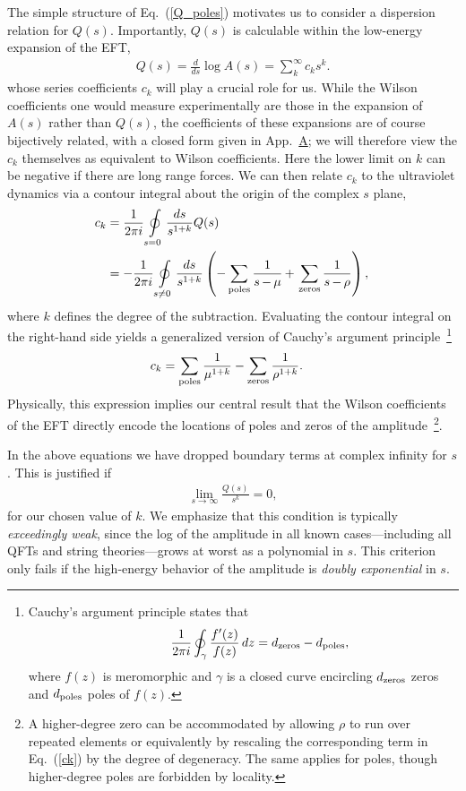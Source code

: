 \documentclass[twocolumn,english,aps,prd,reprint,floatfix,notitlepage,footinbib,preprintnumbers,superscriptaddress,longbibliography]{revtex4-1}
\newcommand{\be}{\begin{equation}}
\newcommand{\ee}{\end{equation}}
\newcommand{\Eq}[1]{Eq.~(\ref{#1})}
\newcommand{\eq}[2]{\be\begin{aligned}#1 \label{#2}\end{aligned}\ee}
\begin{document}
The simple structure of \Eq{Q_poles} motivates us to consider a dispersion relation for $Q(s)$.  Importantly, $Q(s)$ is calculable within the low-energy expansion of the EFT,
\eq{
Q(s) = \frac{d}{ds} \log A(s) = \sum_{k}^\infty c_k s^k.
}{Q_def}
whose series coefficients $c_k$ will play a crucial role for us.
While the Wilson coefficients one would measure experimentally are those in the expansion of $A(s)$ rather than $Q(s)$, the coefficients of these expansions are of course bijectively related, with a closed form given in App.~\hyperref[app:AQ]{A}; we will therefore view the $c_k$ themselves as equivalent to Wilson coefficients.
Here the lower limit on $k$ can be negative if there are long range forces.
We can then relate $c_k$ to the ultraviolet dynamics via a contour integral about the origin of the complex $s$ plane,
\eq{\hspace{-1mm}
c_k&= \frac{1}{2\pi i}\oint\limits_{s=0} \frac{ds}{s^{1+k}} Q(s)\\
 &= {-} \frac{1}{2\pi i}\oint\limits_{s\neq 0}  \frac{ds}{s^{1+k}} \left(  {-}\sum_{\rm poles} \frac{1}{s\,{-}\,\mu}\,{+}\,\sum_{\rm zeros} \frac{1}{s\,{-}\,\rho} \right),
}{}
where $k$ defines the degree of the subtraction.  Evaluating the contour integral on the right-hand side yields a generalized version of Cauchy's argument principle~\footnote{Cauchy's argument principle states that
\begin{equation*}
\qquad\;\;\frac{1}{2\pi i}\protect\oint_\gamma \frac{f'(z)}{f(z)}\,dz = d_{\rm zeros} - d_{\rm poles},
\end{equation*}
where $f(z)$ is meromorphic and $\gamma$ is a closed curve encircling $d_{\rm zeros}$ zeros and $d_{\rm poles}$ poles of $f(z)$.
}
\eq{
c_k&= \sum_{\rm poles} \frac{1}{\mu^{1+k}} - \sum_{\rm zeros} \frac{1}{\rho^{1+k}}  .
}{ck}
Physically, this expression implies our central result that the Wilson coefficients of the EFT directly encode the locations of poles and zeros of the amplitude~\footnote{A higher-degree zero can be accommodated by allowing $\rho$ to run over repeated elements or equivalently by rescaling the corresponding term in \Eq{ck} by the degree of degeneracy.  The same applies for poles, though higher-degree poles are forbidden by locality.}.

In the above equations we have dropped boundary terms at complex infinity for $s$.  This is justified if
\eq{
\lim_{s\rightarrow \infty} \frac{Q(s)}{s^k} =0,
}{}
for our chosen value of $k$.  We emphasize that this condition is typically {\it exceedingly weak},
since the log of the amplitude in all known cases---including all QFTs and string theories---grows at worst as a polynomial in $s$.
This criterion only fails if the high-energy behavior of the amplitude is {\it doubly exponential} in $s$.
\end{document}
